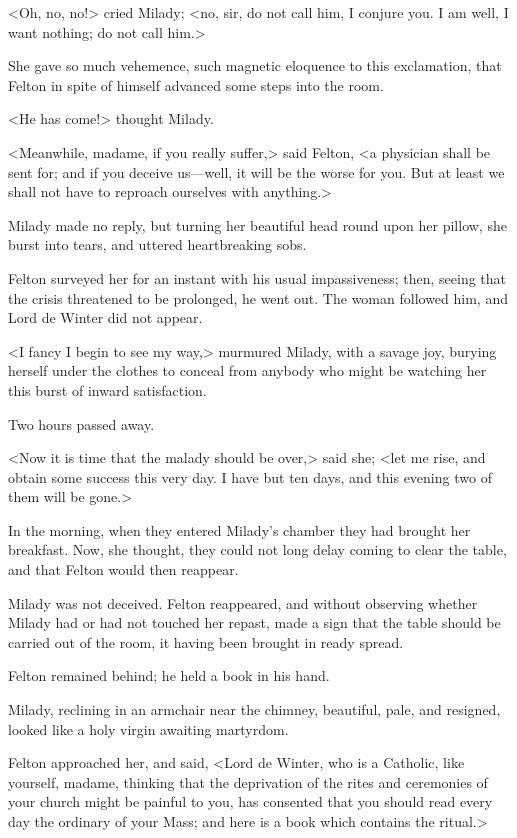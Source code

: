 <Oh, no, no!> cried Milady; <no, sir, do not call him, I conjure you. I am well, I want nothing; do not call him.> 

She gave so much vehemence, such magnetic eloquence to this exclamation, that Felton in spite of himself advanced some steps into the room. 

<He has come!> thought Milady. 

<Meanwhile, madame, if you really suffer,> said Felton, <a physician shall be sent for; and if you deceive us---well, it will be the worse for you. But at least we shall not have to reproach ourselves with anything.> 

Milady made no reply, but turning her beautiful head round upon her pillow, she burst into tears, and uttered heartbreaking sobs. 

Felton surveyed her for an instant with his usual impassiveness; then, seeing that the crisis threatened to be prolonged, he went out. The woman followed him, and Lord de Winter did not appear. 

<I fancy I begin to see my way,> murmured Milady, with a savage joy, burying herself under the clothes to conceal from anybody who might be watching her this burst of inward satisfaction. 

Two hours passed away. 

<Now it is time that the malady should be over,> said she; <let me rise, and obtain some success this very day. I have but ten days, and this evening two of them will be gone.> 

In the morning, when they entered Milady's chamber they had brought her breakfast. Now, she thought, they could not long delay coming to clear the table, and that Felton would then reappear. 

Milady was not deceived. Felton reappeared, and without observing whether Milady had or had not touched her repast, made a sign that the table should be carried out of the room, it having been brought in ready spread. 

Felton remained behind; he held a book in his hand. 

Milady, reclining in an armchair near the chimney, beautiful, pale, and resigned, looked like a holy virgin awaiting martyrdom. 

Felton approached her, and said, <Lord de Winter, who is a Catholic, like yourself, madame, thinking that the deprivation of the rites and ceremonies of your church might be painful to you, has consented that you should read every day the ordinary of your Mass; and here is a book which contains the ritual.> 

